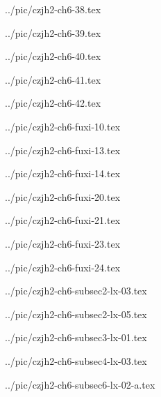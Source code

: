 

../pic/czjh2-ch6-38.tex



../pic/czjh2-ch6-39.tex



../pic/czjh2-ch6-40.tex



../pic/czjh2-ch6-41.tex



../pic/czjh2-ch6-42.tex



../pic/czjh2-ch6-fuxi-10.tex



../pic/czjh2-ch6-fuxi-13.tex



../pic/czjh2-ch6-fuxi-14.tex



../pic/czjh2-ch6-fuxi-20.tex



../pic/czjh2-ch6-fuxi-21.tex



../pic/czjh2-ch6-fuxi-23.tex



../pic/czjh2-ch6-fuxi-24.tex



../pic/czjh2-ch6-subsec2-lx-03.tex



../pic/czjh2-ch6-subsec2-lx-05.tex



../pic/czjh2-ch6-subsec3-lx-01.tex



../pic/czjh2-ch6-subsec4-lx-03.tex



../pic/czjh2-ch6-subsec6-lx-02-a.tex



